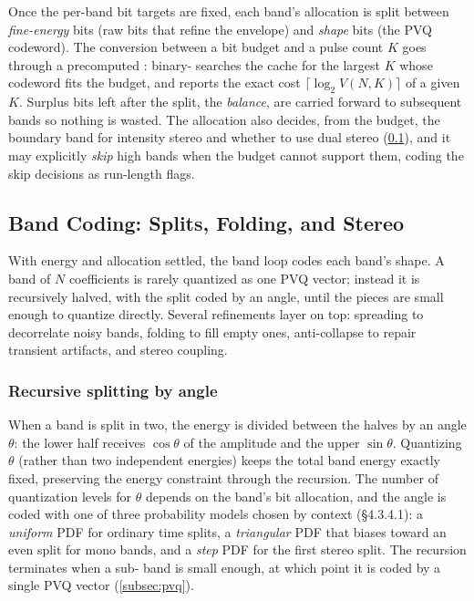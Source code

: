 Once the per-band bit targets are fixed, each band's allocation is split between
\emph{fine-energy} bits (raw bits that refine the envelope) and \emph{shape}
bits (the PVQ codeword). The conversion between a bit budget and a pulse count
$K$ goes through a precomputed :  binary-
searches the cache for the largest $K$ whose codeword fits the budget, and
 reports the exact cost $\lceil\log_2 V(N,K)\rceil$ of a given
$K$. Surplus bits left after the split, the \emph{balance}, are carried forward
to subsequent bands so nothing is wasted. The allocation also decides, from the
budget, the boundary band for intensity stereo and whether to use dual stereo
(\cref{subsec:celt_bands}), and it may explicitly \emph{skip} high bands when the
budget cannot support them, coding the skip decisions as run-length flags.

\subsection{Band Coding: Splits, Folding, and Stereo}\label{subsec:celt_bands}

With energy and allocation settled, the band loop codes each band's shape. A
band of $N$ coefficients is rarely quantized as one PVQ vector; instead it is
recursively halved, with the split coded by an angle, until the pieces are small
enough to quantize directly. Several refinements layer on top: spreading to
decorrelate noisy bands, folding to fill empty ones, anti-collapse to repair
transient artifacts, and stereo coupling.

\subsubsection{Recursive splitting by angle}

When a band is split in two, the energy is divided between the halves by an angle
$\theta$: the lower half receives $\cos\theta$ of the amplitude and the upper
$\sin\theta$. Quantizing $\theta$ (rather than two independent energies) keeps
the total band energy exactly fixed, preserving the energy constraint through the
recursion. The number of quantization levels for $\theta$ depends on the band's
bit allocation, and the angle is coded with one of three probability models
chosen by context (\S4.3.4.1): a \emph{uniform} PDF for ordinary time splits, a
\emph{triangular} PDF that biases toward an even split for mono bands, and a
\emph{step} PDF for the first stereo split. The recursion terminates when a sub-
band is small enough, at which point it is coded by a single PVQ vector
(\cref{subsec:pvq}).

